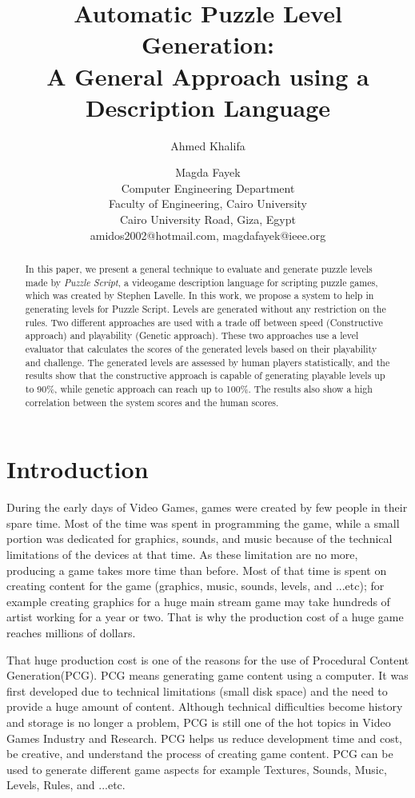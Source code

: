 \documentclass[letterpaper]{article}
\title{Automatic Puzzle Level Generation:\\
A General Approach using a Description Language}
\author{Ahmed Khalifa \and Magda Fayek\\
Computer Engineering Department\\
Faculty of Engineering, Cairo University\\
Cairo University Road, Giza, Egypt\\
amidos2002@hotmail.com, magdafayek@ieee.org\\
}
\begin{document}
 
\maketitle
\begin{abstract}
In this paper, we present a general technique to evaluate and generate puzzle levels made by \emph{Puzzle Script}, a videogame description language for scripting puzzle games, which was created by Stephen Lavelle\cite{puzzleScript}. In this work, we propose a system to help in generating levels for Puzzle Script. Levels are generated without any restriction on the rules. Two different approaches are used with a trade off between speed (Constructive approach) and playability (Genetic approach). These two approaches use a level evaluator that calculates the scores of the generated levels based on their playability and challenge. The generated levels are assessed by human players statistically, and the results show that the constructive approach is capable of generating playable levels up to 90\%, while genetic approach can reach up to 100\%. The results also show a high correlation between the system scores and the human scores.
\end{abstract}

\section{Introduction}
During the early days of Video Games, games were created by few people in their spare time. Most of the time was spent in programming the game, while a small portion was dedicated for graphics, sounds, and music because of the technical limitations of the devices at that time. As these limitation are no more, producing a game takes more time than before. Most of that time is spent on creating content for the game (graphics, music, sounds, levels, and ...etc)\cite{budgetAAA}; for example creating graphics for a huge main stream game may take hundreds of artist working for a year or two. That is why the production cost of a huge game reaches millions of dollars\cite{gameCost}.\\\par

That huge production cost is one of the reasons for the use of Procedural Content Generation(PCG). PCG means generating game content using a computer. It was first developed due to technical limitations (small disk space) and the need to provide a huge amount of content\cite{pcgFirstGame}. Although technical difficulties become history and storage is no longer a problem, PCG is still one of the hot topics in Video Games Industry and Research. PCG helps us reduce development time and cost, be creative, and understand the process of creating game content. PCG can be used to generate different game aspects for example Textures, Sounds, Music, Levels, Rules, and ...etc.\\\par
\end{document}
